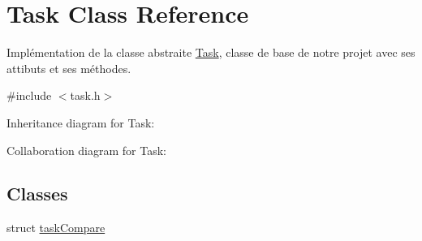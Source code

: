 \hypertarget{class_task}{}\section{Task Class Reference}
\label{class_task}


Implémentation de la classe abstraite \hyperlink{class_task}{Task}, classe de base de notre projet avec ses attibuts et ses méthodes.  




{\ttfamily \#include $<$task.\+h$>$}



Inheritance diagram for Task\+:


Collaboration diagram for Task\+:
\subsection*{Classes}
\begin{DoxyCompactItemize}
\item 
struct \hyperlink{struct_task_1_1task_compare}{task\+Compare}
\end{DoxyCompactItemize}
